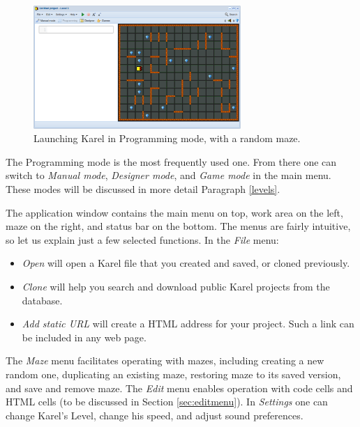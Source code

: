 \begin{figure}[!ht]
\begin{center}
\includegraphics[width=0.7\textwidth]{img/init.png}
\end{center}
\vspace{-2mm}
\caption{Launching Karel in Programming mode, with a random maze.}
\label{fig:init}
\end{figure}

\noindent
The Programming mode is the most frequently used one. From there one can 
switch to {\em Manual mode}, {\em Designer mode}, and {\em Game mode} in 
the main menu. These modes will be discussed in more detail Paragraph \ref{levels}.

The application window contains the main menu on top,
work area on the left, maze on the right, and status bar on the bottom.
The menus are fairly intuitive, so let us explain just a few selected 
functions. In the {\em File} menu:

\begin{itemize}
\item {\em Open} will open a Karel file that you created and saved, or cloned previously.
\item {\em Clone} will help you search and download public Karel projects from the database. 
\item {\em Add static URL} will create a HTML address for your project. Such a link can be 
      included in any web page. 
\end{itemize}
The {\em Maze} menu facilitates operating with mazes, including creating a new random 
one, duplicating an existing maze, restoring maze to its saved version, and save and remove 
maze. The {\em Edit} menu enables operation with code cells and HTML cells (to be discussed in 
Section \ref{sec:editmenu}). In {\em Settings} one can change Karel's Level, change his 
speed, and adjust sound preferences. 

